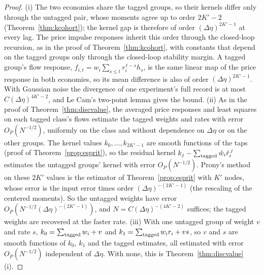 \documentclass[12pt]{article}
\theoremstyle{definition}
\theoremstyle{remark}
\begin{document}
\begin{proof}
(i) The two economies share the tagged groups, so their kernels differ only through the untagged pair, whose moments agree up to order $2K'-2$ (Theorem~\ref{thm:kcohort}); the kernel gap is therefore of order $(\Delta\eta)^{2K'-1}$ at every lag. The price impulse responses inherit this order through the closed-loop recursion, as in the proof of Theorem~\ref{thm:kcohort}, with constants that depend on the tagged groups only through the closed-loop stability margin. A tagged group's flow response, $f_{i,t}=w_i\sum_{s\le t}r_i^{\,t-s}h_s$, is the same linear map of the price response in both economies, so its mean difference is also of order $(\Delta\eta)^{2K'-1}$. With Gaussian noise the divergence of one experiment's full record is at most $C(\Delta\eta)^{4K'-2}$, and Le Cam's two-point lemma gives the bound.
(ii) As in the proof of Theorem~\ref{thm:discvalue}, the averaged price responses and least squares on each tagged class's flows estimate the tagged weights and rates with error $O_P(N^{-1/2})$, uniformly on the class and without dependence on $\Delta\eta$ or on the other groups. The kernel values $k_0,\ldots,k_{2K'-1}$ are smooth functions of the taps (proof of Theorem~\ref{prop:esprit}), so the residual kernel $k_j-\sum_{\rm tagged}\hat w_i\hat r_i^{\,j}$ estimates the untagged groups' kernel with error $O_P(N^{-1/2})$. Prony's method on these $2K'$ values is the estimator of Theorem~\ref{prop:esprit} with $K'$ nodes, whose error is the input error times order $(\Delta\eta)^{-(2K'-1)}$ (the rescaling of the centered moments). So the untagged weights have error $O_P(N^{-1/2}(\Delta\eta)^{-(2K'-1)})$, and $N=C(\Delta\eta)^{-(4K'-2)}$ suffices; the tagged weights are recovered at the faster rate.
(iii) With one untagged group of weight $v$ and rate $s$, $k_0=\sum_{\rm tagged}w_i+v$ and $k_1=\sum_{\rm tagged}w_ir_i+vs$, so $v$ and $s$ are smooth functions of $k_0$, $k_1$ and the tagged estimates, all estimated with error $O_P(N^{-1/2})$ independent of $\Delta\eta$. With none, this is Theorem~\ref{thm:discvalue}(i).
\end{proof}
\end{document}
